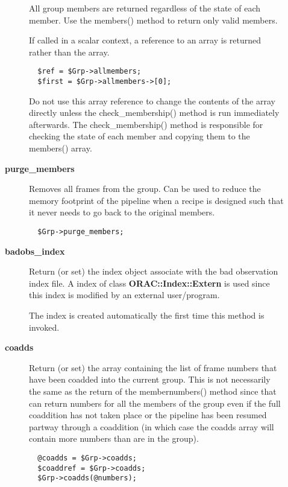 \begin{description}
\begin{description}
All group members are returned regardless of the state of each member.
Use the members() method to return only valid members.



If called in a scalar context, a reference to an array is returned
rather than the array.

\begin{verbatim}
  $ref = $Grp->allmembers;
  $first = $Grp->allmembers->[0];
\end{verbatim}


Do not use this array reference to change the contents of the array
directly unless the check\_membership() method is run immediately
afterwards. The check\_membership() method is responsible for
checking the state of each member and copying them to the members()
array.


\item[{\textbf{purge\_members}}] \mbox{}

Removes all frames from the group. Can be used to reduce the memory
footprint of the pipeline when a recipe is designed such that it never
needs to go back to the original members.

\begin{verbatim}
  $Grp->purge_members;
\end{verbatim}

\item[{\textbf{badobs\_index}}] \mbox{}

Return (or set) the index object associate with the bad observation
index file. A index of class \textbf{ORAC::Index::Extern} is used since
this index is modified by an external user/program.



The index is created automatically the first time this method
is invoked.


\item[{\textbf{coadds}}] \mbox{}

Return (or set) the array containing the list of frame numbers that have
been coadded into the current group. This is not necessarily the same
as the return of the membernumbers() method since that can return numbers
for all the members of the group even if the full coaddition has not
taken place or the pipeline has been resumed partway through a coaddition
(in which case the coadds array will contain more numbers than are in the
group).

\begin{verbatim}
  @coadds = $Grp->coadds;
  $coaddref = $Grp->coadds;
  $Grp->coadds(@numbers);
\end{verbatim}



\end{description}
\end{description}
